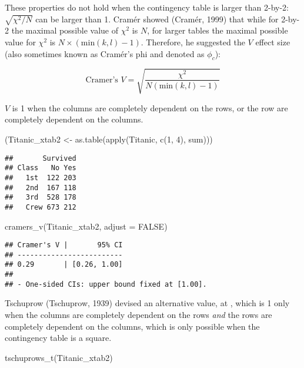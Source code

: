 \documentclass[
]{article}
\newenvironment{Shaded}{\begin{snugshade}}{\end{snugshade}}
\newcommand{\AttributeTok}[1]{\textcolor[rgb]{0.77,0.63,0.00}{#1}}
\newcommand{\ConstantTok}[1]{\textcolor[rgb]{0.00,0.00,0.00}{#1}}
\newcommand{\DecValTok}[1]{\textcolor[rgb]{0.00,0.00,0.81}{#1}}
\newcommand{\FunctionTok}[1]{\textcolor[rgb]{0.00,0.00,0.00}{#1}}
\newcommand{\NormalTok}[1]{#1}
\newcommand{\OtherTok}[1]{\textcolor[rgb]{0.56,0.35,0.01}{#1}}
\begin{document}
These properties do not hold when the contingency table is larger than
2-by-2: \(\sqrt{\chi^2/N}\) can be larger than 1. Cramér showed (Cramér,
1999) that while for 2-by-2 the maximal possible value of \(\chi^2\) is
\(N\), for larger tables the maximal possible value for \(\chi^2\) is
\(N\times (\text{min}(k,l)-1)\). Therefore, he suggested the \(V\)
effect size (also sometimes known as Cramér's phi and denoted as
\(\phi_{c}\)):

\[
\text{Cramer's } V = \sqrt{\frac{\chi^2}{N(\text{min}(k,l)-1)}}
\]

\(V\) is 1 when the columns are completely dependent on the rows, or the
row are completely dependent on the columns.

\begin{Shaded}
\begin{Highlighting}[]
\NormalTok{(Titanic\_xtab2 }\OtherTok{\textless{}{-}} \FunctionTok{as.table}\NormalTok{(}\FunctionTok{apply}\NormalTok{(Titanic, }\FunctionTok{c}\NormalTok{(}\DecValTok{1}\NormalTok{, }\DecValTok{4}\NormalTok{), sum)))}
\end{Highlighting}
\end{Shaded}

\begin{verbatim}
##       Survived
## Class   No Yes
##   1st  122 203
##   2nd  167 118
##   3rd  528 178
##   Crew 673 212
\end{verbatim}

\begin{Shaded}
\begin{Highlighting}[]
\FunctionTok{cramers\_v}\NormalTok{(Titanic\_xtab2, }\AttributeTok{adjust =} \ConstantTok{FALSE}\NormalTok{)}
\end{Highlighting}
\end{Shaded}

\begin{verbatim}
## Cramer's V |       95% CI
## -------------------------
## 0.29       | [0.26, 1.00]
## 
## - One-sided CIs: upper bound fixed at [1.00].
\end{verbatim}

Tschuprow (Tschuprow, 1939) devised an alternative value, at , which is
1 only when the columns are completely dependent on the rows \emph{and}
the rows are completely dependent on the columns, which is only possible
when the contingency table is a square.

\begin{Shaded}
\begin{Highlighting}[]
\FunctionTok{tschuprows\_t}\NormalTok{(Titanic\_xtab2)}
\end{Highlighting}
\end{Shaded}
\end{document}
